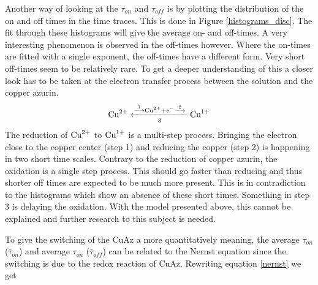 \documentclass[twoside,single]{lion-msc}
\begin{document}
Another way of looking at the $\tau_{on}$ and  $\tau_{off}$ is by plotting the distribution of the on and off times in the time traces. This is done in Figure \ref{histograms_disc}. The fit through these histograms will give the average on- and off-times. A very interesting phenomenon is observed in the off-times however. Where the on-times are fitted with a single exponent, the off-times have a different form. Very short off-times seem to be relatively rare. To get a deeper understanding of this a closer look has to be taken at the electron transfer process between the solution and the copper azurin.
\begin{equation}\label{ox_pros}
\textup{Cu}^{2+}\xleftarrow[3]{\overset{1}{\longrightarrow}\textup{Cu}^{2+}+ e^{-}\overset{2}{\longrightarrow}}\textup{Cu}^{1+}
\end{equation}
The reduction of $\textup{Cu}^{2+}$ to $\textup{Cu}^{1+}$ is a multi-step process. Bringing the electron close to the copper center (step 1) and reducing the copper (step 2) is happening in two short time scales. Contrary to the reduction of copper azurin, the oxidation is a single step process. This should go faster than reducing and thus shorter off times are expected to be much more present. This is in contradiction to the histograms which show an absence of these short times. Something in step 3 is delaying the oxidation. With the model presented above, this cannot be explained and further research to this subject is needed.

To give the switching of the CuAz a more quantitatively meaning, the average $\tau_{on}$ ($\bar{\tau}_{on}$) and average $\tau_{on}$ ($\bar{\tau}_{off}$) can be related to the Nernst equation since the switching is due to the redox reaction of CuAz. Rewriting equation \ref{nernst} we get 
\end{document}
